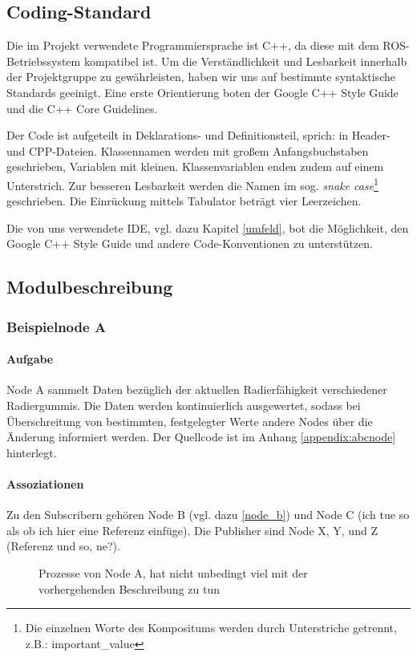\documentclass[a4paper, 12pt, titlepage]{scrartcl}
\begin{document}
		\subsection{Coding-Standard} 
		\label{coding_standard}
			Die im Projekt verwendete Programmiersprache ist C++, da diese mit dem ROS-Betriebssystem kompatibel ist. 
			Um die Verständlichkeit und Lesbarkeit innerhalb der Projektgruppe zu gewährleisten, haben wir uns auf 
			bestimmte syntaktische Standards geeinigt. Eine erste Orientierung boten der Google C++ Style Guide\cite{googleTest} und die C++ Core Guidelines\cite{cppCoreGuide}. 
			
			Der Code ist aufgeteilt in Deklarations- und Definitionsteil, sprich: in Header- und CPP-Dateien.
			Klassennamen werden mit großem Anfangsbuchstaben geschrieben, Variablen mit kleinen. Klassenvariablen enden zudem 
			auf einem Unterstrich. Zur besseren Lesbarkeit werden die Namen im sog. \emph{snake case}\footnote{Die einzelnen 
			Worte des Kompositums werden durch Unterstriche getrennt, z.B.: important\_value} geschrieben. 
			Die Einrückung mittels Tabulator beträgt vier Leerzeichen. 
			
			Die von uns verwendete IDE, vgl. dazu Kapitel \ref{umfeld}, bot die Möglichkeit, den Google C++ Style Guide und andere Code-Konventionen zu unterstützen. 

		\subsection{Modulbeschreibung} 
		\label{modulbeschreibung}
			\subsubsection{Beispielnode A}
			\label{node_a}
				\paragraph{Aufgabe} Node A sammelt Daten bezüglich der aktuellen Radierfähigkeit verschiedener Radiergummis. Die Daten werden kontinuierlich ausgewertet, sodass bei Überschreitung von bestimmten, festgelegter Werte andere Nodes über die Änderung informiert werden. Der Quellcode ist im Anhang \ref{appendix:abcnode} hinterlegt. 
				
				\paragraph{Assoziationen} Zu den Subscribern gehören Node B (vgl. dazu \ref{node_b}) und Node C (ich tue so als ob ich hier eine Referenz einfüge). Die Publisher sind Node X, Y, und Z (Referenz und so, ne?).
				\begin{figure}[h!]
					\centering
					\caption{Prozesse von Node A, hat nicht unbedingt viel mit der vorhergehenden Beschreibung zu tun}
					\label{fig:node_a}
				\end{figure}
				
\end{document}
